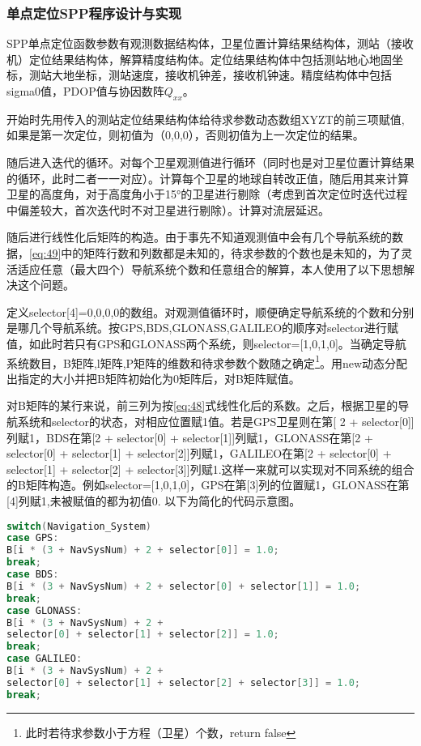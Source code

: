 \documentclass{ctexart}
\begin{document}
\subsubsection{单点定位SPP程序设计与实现}
SPP单点定位函数参数有观测数据结构体，卫星位置计算结果结构体，测站（接收机）定位结果结构体，解算精度结构体。定位结果结构体中包括测站地心地固坐标，测站大地坐标，测站速度，接收机钟差，接收机钟速。精度结构体中包括sigma0值，PDOP值与协因数阵$Q_{xx}$。

开始时先用传入的测站定位结果结构体给待求参数动态数组XYZT的前三项赋值,如果是第一次定位，则初值为（0,0,0），否则初值为上一次定位的结果。

随后进入迭代的循环。对每个卫星观测值进行循环（同时也是对卫星位置计算结果的循环，此时二者一一对应）。计算每个卫星的地球自转改正值，随后用其来计算卫星的高度角，对于高度角小于15°的卫星进行剔除（考虑到首次定位时迭代过程中偏差较大，首次迭代时不对卫星进行剔除）。计算对流层延迟。

随后进行线性化后矩阵的构造。由于事先不知道观测值中会有几个导航系统的数据，\eqref{eq:49}中的矩阵行数和列数都是未知的，待求参数的个数也是未知的，为了灵活适应任意（最大四个）导航系统个数和任意组合的解算，本人使用了以下思想解决这个问题。

定义selector[4]={0,0,0,0}的数组。对观测值循环时，顺便确定导航系统的个数和分别是哪几个导航系统。按GPS,BDS,GLONASS,GALILEO的顺序对selector进行赋值，如此时若只有GPS和GLONASS两个系统，则selector=[1,0,1,0]。当确定导航系统数目，B矩阵,l矩阵,P矩阵的维数和待求参数个数随之确定\footnote{此时若待求参数小于方程（卫星）个数，return false}。用new动态分配出指定的大小并把B矩阵初始化为0矩阵后，对B矩阵赋值。

对B矩阵的某行来说，前三列为按\eqref{eq:48}式线性化后的系数。之后，根据卫星的导航系统和selector的状态，对相应位置赋1值。若是GPS卫星则在第[ 2 + selector[0]]列赋1，BDS在第[2 + selector[0] + selector[1]]列赋1，GLONASS在第[2 + selector[0] + selector[1] + selector[2]]列赋1，GALILEO在第[2 + selector[0] + selector[1] + selector[2] + selector[3]]列赋1.这样一来就可以实现对不同系统的组合的B矩阵构造。例如selector=[1,0,1,0]，GPS在第[3]列的位置赋1，GLONASS在第[4]列赋1,未被赋值的都为初值0.
以下为简化的代码示意图。
\begin{lstlisting}[language=C]
switch(Navigation_System)
case GPS:
B[i * (3 + NavSysNum) + 2 + selector[0]] = 1.0;
break;
case BDS:
B[i * (3 + NavSysNum) + 2 + selector[0] + selector[1]] = 1.0;
break;
case GLONASS:
B[i * (3 + NavSysNum) + 2 + 
selector[0] + selector[1] + selector[2]] = 1.0;
break;
case GALILEO:
B[i * (3 + NavSysNum) + 2 + 
selector[0] + selector[1] + selector[2] + selector[3]] = 1.0;
break;
\end{lstlisting}
\end{document}
